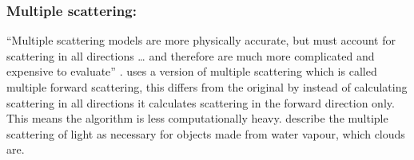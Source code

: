 \subsubsection{Multiple scattering:}
“Multiple scattering models are more physically accurate, but must account for scattering in all directions … and therefore are much more complicated and expensive to evaluate” \citep{MHarris01}.
\citet{HarrisEtAl03} uses a version of multiple scattering which is called multiple forward scattering, this differs from the original by instead of calculating scattering in all directions it calculates scattering in the forward direction only.
This means the algorithm is less computationally heavy. \citet*{Fedkiw01} describe the multiple scattering of light as necessary for objects made from water vapour, which clouds are.
